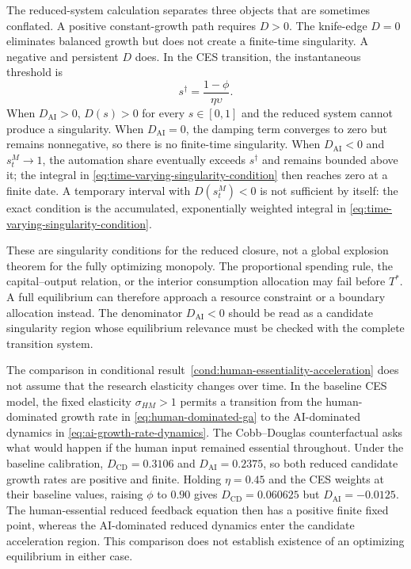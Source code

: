 The reduced-system calculation separates three objects that are sometimes conflated. A positive
constant-growth path requires $D>0$. The knife-edge $D=0$ eliminates balanced
growth but does not create a finite-time singularity. A negative and persistent
$D$ does. In the CES transition, the instantaneous threshold is
\begin{equation}
    s^\dagger
    =
    \frac{1-\phi}{\eta\upsilon}.
    \label{eq:critical-automation-share}
\end{equation}
When $D_{\mathrm{AI}}>0$, $D(s)>0$ for every $s\in[0,1]$ and the reduced system
cannot produce a singularity. When $D_{\mathrm{AI}}=0$, the damping term converges
to zero but remains nonnegative, so there is no finite-time singularity. When
$D_{\mathrm{AI}}<0$ and $s^M_t\to1$, the automation share eventually exceeds
$s^\dagger$ and remains bounded above it; the integral in
\eqref{eq:time-varying-singularity-condition} then reaches zero at a finite date.
A temporary interval with $D(s^M_t)<0$ is not sufficient by itself: the exact
condition is the accumulated, exponentially weighted integral in
\eqref{eq:time-varying-singularity-condition}.

These are singularity conditions for the reduced closure, not a global explosion
theorem for the fully optimizing monopoly. The proportional spending rule, the
capital--output relation, or the interior consumption allocation may fail before
$T^*$. A full equilibrium can therefore approach a resource constraint or a
boundary allocation instead. The denominator $D_{\mathrm{AI}}<0$ should be read as
a candidate singularity region whose equilibrium relevance must be checked with the
complete transition system.

The comparison in conditional result~\ref{cond:human-essentiality-acceleration} does not
assume that the research elasticity changes over time. In the baseline CES model,
the fixed elasticity $\sigma_{HM}>1$ permits a transition from the human-dominated growth
rate in \eqref{eq:human-dominated-ga} to the AI-dominated dynamics in
\eqref{eq:ai-growth-rate-dynamics}. The Cobb--Douglas counterfactual asks what would
happen if the human input remained essential throughout. Under the baseline
calibration, $D_{\mathrm{CD}}=0.3106$ and $D_{\mathrm{AI}}=0.2375$, so both reduced
candidate growth rates are positive and finite. Holding $\eta=0.45$ and the CES
weights at their baseline values, raising $\phi$ to $0.90$ gives
$D_{\mathrm{CD}}=0.060625$ but $D_{\mathrm{AI}}=-0.0125$. The human-essential
reduced feedback equation then has a positive finite fixed point, whereas the
AI-dominated reduced dynamics enter the candidate acceleration region. This
comparison does not establish existence of an optimizing equilibrium in either
case.

